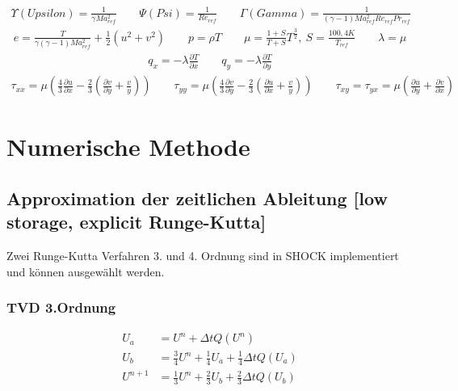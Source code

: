 \begin{align*}
\Upsilon (Upsilon)=\frac{1}{\gamma Ma_{ref}^2}
\ \ \ \ \ \ \ \ \ 
\Psi (Psi)=\frac{1}{Re_{ref}}
\ \ \ \ \ \ \ \ \ 
\Gamma (Gamma)=\frac{1}{\left(\gamma -1 \right)Ma_{ref}^2 Re_{ref} Pr_{ref}}
\end{align*}
\begin{align*}
e=\frac{T}{\gamma \left(\gamma -1\right)Ma_{ref}^2}+\frac{1}{2}\left(u^2+v^2\right)
\ \ \ \ \ \ \ \ \ 
p=\rho T
\ \ \ \ \ \ \ \ \ 
\mu=\frac{1+S}{T+S}T^\frac{3}{2},\ S=\frac{100,4K}{{T_{ref}}}
\ \ \ \ \ \ \ \ \ 
\lambda=\mu
\end{align*}
\begin{align*}
q_x=-\lambda \frac{\partial T}{\partial x}
\ \ \ \ \ \ \ \ \ 
q_y=-\lambda \frac{\partial T}{\partial y}
\end{align*}
\begin{align*}
\tau_{xx}=\mu \left(\frac{4}{3}\frac{\partial u}{\partial x}-\frac{2}{3}\left(\frac{\partial v}{\partial y} +\frac{v}{y}\right)\right)
\ \ \ \ \ \ \ \ \
\tau_{yy}=\mu \left(\frac{4}{3}\frac{\partial v}{\partial y}-\frac{2}{3}\left(\frac{\partial u}{\partial x} +\frac{v}{y}\right)\right)
\ \ \ \ \ \ \ \ \ 
\tau_{xy}=\tau_{yx}=\mu \left(\frac{\partial u}{\partial y}+\frac{\partial v}{\partial x} \right)
\end{align*}

\newpage

\section{Numerische Methode}

\subsection{Approximation der zeitlichen Ableitung [low storage, explicit Runge-Kutta]}
Zwei Runge-Kutta Verfahren 3. und 4. Ordnung sind in SHOCK implementiert und können ausgewählt werden.
\subsubsection{TVD 3.Ordnung}
\begin{align*}
U_{a}&=U^{n}+\varDelta t Q\left(U^{n}\right)
\\
U_{b}&=\frac{3}{4}U^{n}+\frac{1}{4}U_a+\frac{1}{4}\varDelta t Q\left(U_{a}\right)
\\
U^{n+1}&=\frac{1}{3}U^{n}+\frac{2}{3}U_b+\frac{2}{3}\varDelta t Q\left(U_{b}\right)
\end{align*}


